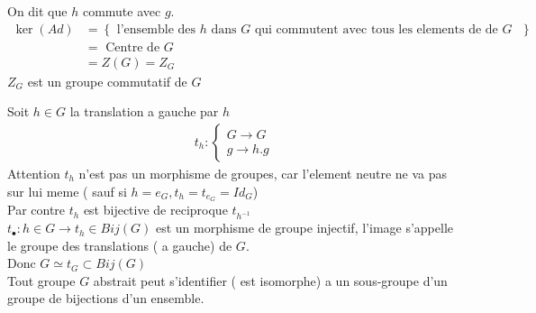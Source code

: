 \documentclass[../main.tex]{subfiles}
\begin{document}
On dit que $h$ commute avec $g$.
\begin{align*}
	\ker(Ad) &= \left\{ \text{ l'ensemble des $h$ dans $G$ qui commutent avec tous les elements de de $G$ }  \right\} \\
&= \text{ Centre de  } G\\
&= Z(G) = Z_{G} 
\end{align*}
$Z_G$ est un groupe commutatif de $G$ 
\begin{exemple}[Translation]

Soit $h \in G$ la translation a gauche par $h$ 
\begin{align*}
t_h:
\begin{cases}
G \to G\\
g \to h.g
\end{cases}
\end{align*}
Attention $t_h$ n'est pas un morphisme de groupes, car l'element neutre ne va pas sur lui meme ( sauf si $h = e_G, t_h = t _{e_G} = Id_G $)\\
Par contre $t_h$ est bijective de reciproque $t_{h^{-1}} $\\

$ t_{\bullet} :h \in G \to t_h \in Bij(G)$ 
est un morphisme de groupe injectif, l'image s'appelle le groupe des translations ( a gauche) de $G$.\\
Donc $G \simeq t_G \subset Bij(G)$ \\
Tout groupe $G$ abstrait peut s'identifier ( est isomorphe) a un sous-groupe d'un groupe de bijections d'un ensemble.

\end{exemple}
\end{document}
